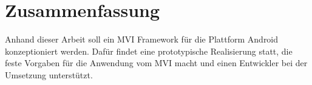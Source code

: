 \thispagestyle{empty}
\section*{Zusammenfassung}
Anhand dieser Arbeit soll ein MVI Framework für die Plattform Android konzeptioniert werden. Dafür findet eine prototypische Realisierung statt, die feste Vorgaben für die Anwendung vom MVI macht und einen Entwickler bei der Umsetzung unterstützt.
